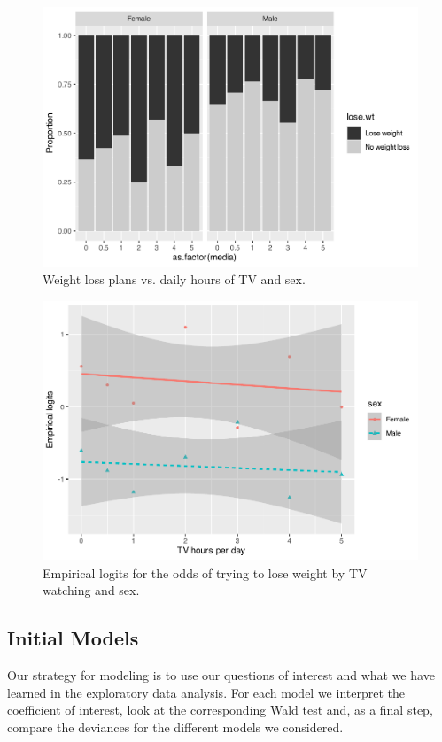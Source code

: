 \documentclass[
]{krantz}
\begin{document}
\begin{figure}

{\centering \includegraphics[width=0.6\linewidth]{bookdown-BeyondMLR_files/figure-latex/mediaXsex-1} 

}

\caption{Weight loss plans vs. daily hours of TV and sex.}\label{fig:mediaXsex}
\end{figure}

\begin{figure}

{\centering \includegraphics[width=0.6\linewidth]{bookdown-BeyondMLR_files/figure-latex/logitmediasex-1} 

}

\caption{Empirical logits for the odds of trying to lose weight by TV watching and sex.}\label{fig:logitmediasex}
\end{figure}

\subsection{Initial Models}\label{initial-models-2}

Our strategy for modeling is to use our questions of interest and what we have learned in the exploratory data analysis. For each model we interpret the coefficient of interest, look at the corresponding Wald test and, as a final step, compare the deviances for the different models we considered.
\end{document}
